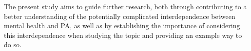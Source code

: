 

The present study aims to guide further research, both through contributing to a better understanding of the potentially
complicated interdependence between mental health and PA, as well as by establishing the importance of considering this
interdependence when studying the topic and providing an example way to do so.
